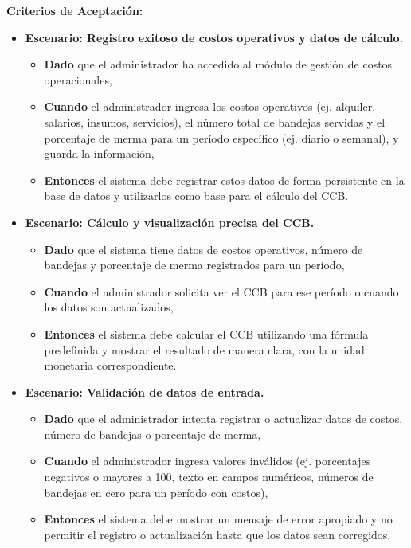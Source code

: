 \documentclass[12pt]{article}
\begin{document}
\textbf{Criterios de Aceptación:}
\begin{itemize}
	\item \textbf{Escenario: Registro exitoso de costos operativos y datos de cálculo.}
	\begin{itemize}
		\item \textbf{Dado} que el administrador ha accedido al módulo de gestión de costos operacionales,
		\item \textbf{Cuando} el administrador ingresa los costos operativos (ej. alquiler, salarios, insumos, servicios), el número total de bandejas servidas y el porcentaje de merma para un período específico (ej. diario o semanal), y guarda la información,
		\item \textbf{Entonces} el sistema debe registrar estos datos de forma persistente en la base de datos y utilizarlos como base para el cálculo del CCB.
	\end{itemize}

	\item \textbf{Escenario: Cálculo y visualización precisa del CCB.}
	\begin{itemize}
		\item \textbf{Dado} que el sistema tiene datos de costos operativos, número de bandejas y porcentaje de merma registrados para un período,
		\item \textbf{Cuando} el administrador solicita ver el CCB para ese período o cuando los datos son actualizados,
		\item \textbf{Entonces} el sistema debe calcular el CCB utilizando una fórmula predefinida y mostrar el resultado de manera clara, con la unidad monetaria correspondiente.
	\end{itemize}

	\item \textbf{Escenario: Validación de datos de entrada.}
	\begin{itemize}
		\item \textbf{Dado} que el administrador intenta registrar o actualizar datos de costos, número de bandejas o porcentaje de merma,
		\item \textbf{Cuando} el administrador ingresa valores inválidos (ej. porcentajes negativos o mayores a 100, texto en campos numéricos, números de bandejas en cero para un período con costos),
		\item \textbf{Entonces} el sistema debe mostrar un mensaje de error apropiado y no permitir el registro o actualización hasta que los datos sean corregidos.
	\end{itemize}
\end{itemize}
\end{document}
